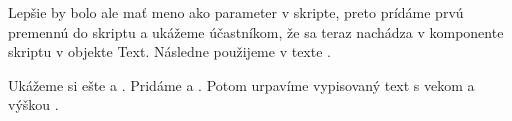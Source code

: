 Lepšie by bolo ale mať meno ako parameter v skripte, preto prídáme prvú premennú  do skriptu a ukážeme účastníkom, že sa teraz nachádza v komponente skriptu v objekte Text. Následne  použijeme v texte .



Ukážeme si ešte  a . Pridáme  a . Potom urpavíme vypisovaný text s vekom a výškou .

\clearpage
